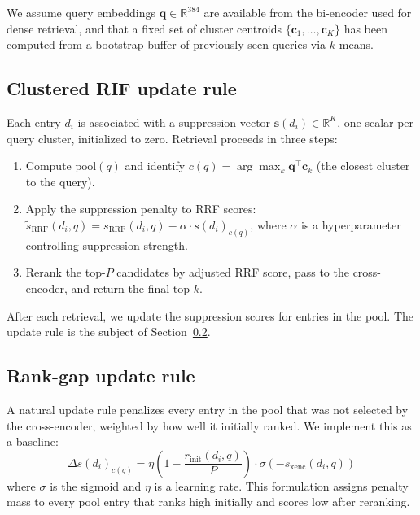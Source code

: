 \documentclass[11pt,a4paper]{article}
\begin{document}
We assume query embeddings $\mathbf{q} \in \mathbb{R}^{384}$ are available from the bi-encoder used for dense retrieval, and that a fixed set of cluster centroids $\{\mathbf{c}_1, \dots, \mathbf{c}_K\}$ has been computed from a bootstrap buffer of previously seen queries via $k$-means.

\subsection{Clustered RIF update rule}

Each entry $d_i$ is associated with a suppression vector $\mathbf{s}(d_i) \in \mathbb{R}^K$, one scalar per query cluster, initialized to zero. Retrieval proceeds in three steps:

\begin{enumerate}
  \item Compute $\mathrm{pool}(q)$ and identify $c(q) = \arg\max_k \mathbf{q}^\top \mathbf{c}_k$ (the closest cluster to the query).
  \item Apply the suppression penalty to RRF scores: $\tilde s_{\text{RRF}}(d_i, q) = s_{\text{RRF}}(d_i, q) - \alpha \cdot s(d_i)_{c(q)}$, where $\alpha$ is a hyperparameter controlling suppression strength.
  \item Rerank the top-$P$ candidates by adjusted RRF score, pass to the cross-encoder, and return the final top-$k$.
\end{enumerate}

After each retrieval, we update the suppression scores for entries in the pool. The update rule is the subject of Section~\ref{sec:rank-gap}.

\subsection{Rank-gap update rule}
\label{sec:rank-gap}

A natural update rule penalizes every entry in the pool that was not selected by the cross-encoder, weighted by how well it initially ranked. We implement this as a baseline:
\begin{equation}
  \Delta s(d_i)_{c(q)} = \eta \left(1 - \frac{r_{\text{init}}(d_i, q)}{P}\right) \cdot \sigma(-s_{\text{xenc}}(d_i, q))
  \label{eq:rif-uniform}
\end{equation}
where $\sigma$ is the sigmoid and $\eta$ is a learning rate. This formulation assigns penalty mass to every pool entry that ranks high initially and scores low after reranking.
\end{document}
